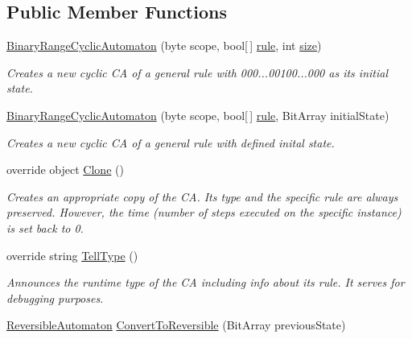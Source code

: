 \subsection*{Public Member Functions}
\begin{DoxyCompactItemize}
\item 
\hyperlink{class_cellular_1_1_binary_range_cyclic_automaton_a9f47b4027eba7db4a959946967ba371e}{Binary\+Range\+Cyclic\+Automaton} (byte scope, bool\mbox{[}$\,$\mbox{]} \hyperlink{class_cellular_1_1_binary_range_automaton_a4dda99c3151599c8ef12d08d7472144c}{rule}, int \hyperlink{class_cellular_1_1_automaton1_d_a915129ccf0f1e7092844c99ce6a28e5b}{size})
\begin{DoxyCompactList}\small\item\em Creates a new cyclic C\+A of a general rule with 000...00100...000 as its initial state. \end{DoxyCompactList}\item 
\hyperlink{class_cellular_1_1_binary_range_cyclic_automaton_a541a8c6eff23ec8afddc7388158df80e}{Binary\+Range\+Cyclic\+Automaton} (byte scope, bool\mbox{[}$\,$\mbox{]} \hyperlink{class_cellular_1_1_binary_range_automaton_a4dda99c3151599c8ef12d08d7472144c}{rule}, Bit\+Array initial\+State)
\begin{DoxyCompactList}\small\item\em Creates a new cyclic C\+A of a general rule with defined inital state. \end{DoxyCompactList}\item 
override object \hyperlink{class_cellular_1_1_binary_range_cyclic_automaton_a2361fe82802e372b24b8bec6a6135278}{Clone} ()
\begin{DoxyCompactList}\small\item\em Creates an appropriate copy of the C\+A. Its type and the specific rule are always preserved. However, the time (number of steps executed on the specific instance) is set back to 0. \end{DoxyCompactList}\item 
override string \hyperlink{class_cellular_1_1_binary_range_cyclic_automaton_a75754d1c54550e1f29a9282647947cb8}{Tell\+Type} ()
\begin{DoxyCompactList}\small\item\em Announces the runtime type of the C\+A including info about its rule. It serves for debugging purposes. \end{DoxyCompactList}\item 
\hyperlink{class_cellular_1_1_reversible_automaton}{Reversible\+Automaton} \hyperlink{class_cellular_1_1_binary_range_cyclic_automaton_a68dc88c2cb78aaaf6246ebf6f058fbb9}{Convert\+To\+Reversible} (Bit\+Array previous\+State)
\end{DoxyCompactItemize}
